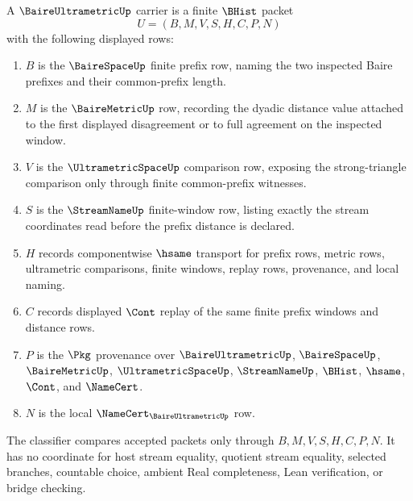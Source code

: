 \begin{definition}
\label{def:baire-ultrametric-carrier}
A $\BaireUltrametricUp$ carrier is a finite $\BHist$ packet
$$
U=(B,M,V,S,H,C,P,N)
$$
with the following displayed rows:
\begin{enumerate}
\item $B$ is the $\BaireSpaceUp$ finite prefix row, naming the two inspected Baire prefixes and their common-prefix length.
\item $M$ is the $\BaireMetricUp$ row, recording the dyadic distance value attached to the first displayed disagreement or to full agreement on the inspected window.
\item $V$ is the $\UltrametricSpaceUp$ comparison row, exposing the strong-triangle comparison only through finite common-prefix witnesses.
\item $S$ is the $\StreamNameUp$ finite-window row, listing exactly the stream coordinates read before the prefix distance is declared.
\item $H$ records componentwise $\hsame$ transport for prefix rows, metric rows, ultrametric comparisons, finite windows, replay rows, provenance, and local naming.
\item $C$ records displayed $\Cont$ replay of the same finite prefix windows and distance rows.
\item $P$ is the $\Pkg$ provenance over $\BaireUltrametricUp$, $\BaireSpaceUp$, $\BaireMetricUp$, $\UltrametricSpaceUp$, $\StreamNameUp$, $\BHist$, $\hsame$, $\Cont$, and $\NameCert$.
\item $N$ is the local $\NameCert_{\BaireUltrametricUp}$ row.
\end{enumerate}
The classifier compares accepted packets only through $B,M,V,S,H,C,P,N$. It has no coordinate for host stream equality, quotient stream equality, selected branches, countable choice, ambient Real completeness, Lean verification, or bridge checking.
\end{definition}

